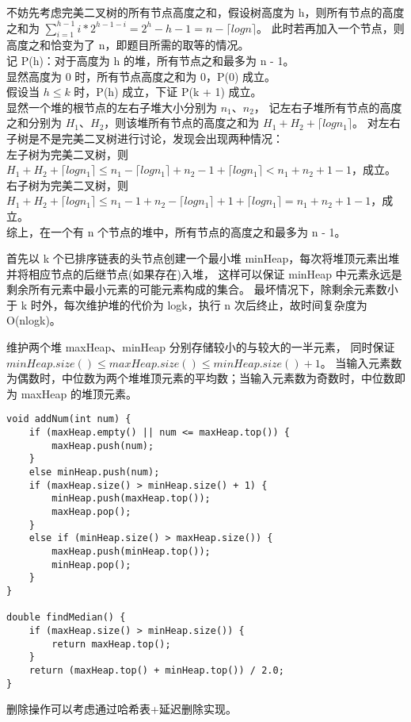 \documentclass[12pt, a4paper, oneside]{ctexart}
\begin{document}
\begin{solution}[14.4]
不妨先考虑完美二叉树的所有节点高度之和，假设树高度为 h，则所有节点的高度之和为 $\sum_{i = 1}^{h - 1} i * 2^{h - 1 - i} = 2^h - h - 1 = n - \lceil logn \rceil$。
此时若再加入一个节点，则高度之和恰变为了 n，即题目所需的取等的情况。
\\记 P(h)：对于高度为 h 的堆，所有节点之和最多为 n - 1。
\\显然高度为 0 时，所有节点高度之和为 0，P(0) 成立。
\\假设当 $h \leq k$ 时，P(h) 成立，下证 P(k + 1) 成立。
\\显然一个堆的根节点的左右子堆大小分别为 $n_1$、$n_2$，
记左右子堆所有节点的高度之和分别为 $H_1$、$H_2$，则该堆所有节点的高度之和为 $H_1 + H_2 + \lceil logn_1 \rceil$。
对左右子树是不是完美二叉树进行讨论，发现会出现两种情况：
\\左子树为完美二叉树，则 $H_1 + H_2 + \lceil logn_1 \rceil \leq n_1 - \lceil logn_1 \rceil + n_2 - 1 + \lceil logn_1 \rceil < n_1 + n_2 + 1 - 1$，成立。
\\右子树为完美二叉树，则 $H_1 + H_2 + \lceil logn_1 \rceil \leq n_1 - 1 + n_2 - \lceil logn_1 \rceil + 1 + \lceil logn_1 \rceil = n_1 + n_2 + 1 - 1$，成立。
\\综上，在一个有 n 个节点的堆中，所有节点的高度之和最多为 n - 1。
\end{solution}

\begin{solution}[14.5]
首先以 k 个已排序链表的头节点创建一个最小堆 minHeap，每次将堆顶元素出堆并将相应节点的后继节点(如果存在)入堆，
这样可以保证 minHeap 中元素永远是剩余所有元素中最小元素的可能元素构成的集合。
最坏情况下，除剩余元素数小于 k 时外，每次维护堆的代价为 logk，执行 n 次后终止，故时间复杂度为 O(nlogk)。
\end{solution}

\begin{solution}[14.6]
维护两个堆 maxHeap、minHeap 分别存储较小的与较大的一半元素，
同时保证 $minHeap.size() \leq maxHeap.size() \leq minHeap.size() + 1$。
当输入元素数为偶数时，中位数为两个堆堆顶元素的平均数；当输入元素数为奇数时，中位数即为 maxHeap 的堆顶元素。
\begin{verbatim}
void addNum(int num) {
    if (maxHeap.empty() || num <= maxHeap.top()) {
        maxHeap.push(num);
    } 
    else minHeap.push(num);
    if (maxHeap.size() > minHeap.size() + 1) {
        minHeap.push(maxHeap.top());
        maxHeap.pop();
    } 
    else if (minHeap.size() > maxHeap.size()) {
        maxHeap.push(minHeap.top());
        minHeap.pop();
    }
}
    
double findMedian() {
    if (maxHeap.size() > minHeap.size()) {
        return maxHeap.top();
    }
    return (maxHeap.top() + minHeap.top()) / 2.0;
}
\end{verbatim}
删除操作可以考虑通过哈希表+延迟删除实现。
\end{solution}
\end{document}
